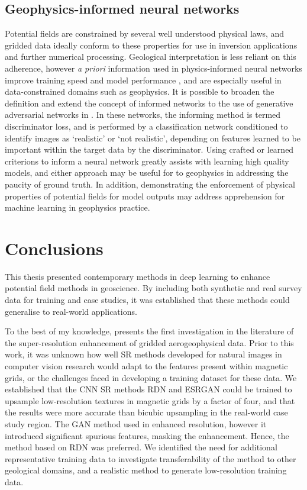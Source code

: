 \section{Geophysics-informed neural networks}
Potential fields are constrained by several well understood physical laws, and gridded data ideally conform to these properties for use in inversion applications and further numerical processing.
Geological interpretation is less reliant on this adherence, however \emph{a priori} information used in physics-informed neural networks improve training speed and model performance \parencite{raissiPhysicsinformedNeuralNetworks2019}, and are especially useful in data-constrained domains such as geophysics.
It is possible to broaden the definition and extend the concept of informed networks to the use of generative adversarial networks in .
In these networks, the informing method is termed discriminator loss, and is performed by a classification network conditioned to identify images as `realistic' or `not realistic', depending on features learned to be important within the target data by the discriminator.
Using crafted or learned criterions to inform a neural network greatly assists with learning high quality models, and either approach may be useful for to geophysics in addressing the paucity of ground truth.
In addition, demonstrating the enforcement of physical properties of potential fields for model outputs may address apprehension for machine learning in geophysics practice.

\printbibliography{}

\chapter{Conclusions}
\label{ch:conclusions}
This thesis presented contemporary methods in deep learning to enhance potential field methods in geoscience.
By including both synthetic and real survey data for training and case studies, it was established that these methods could generalise to real-world applications.

To the best of my knowledge,  presents the first investigation in the literature of the super-resolution enhancement of gridded aerogeophysical data.
Prior to this work, it was unknown how well SR methods developed for natural images in computer vision research would adapt to the features present within magnetic grids, or the challenges faced in developing a training dataset for these data.
We established that the CNN SR methods RDN and ESRGAN could be trained to upsample low-resolution textures in magnetic grids by a factor of four, and that the results were more accurate than bicubic upsampling in the real-world case study region.
The GAN method used in  enhanced resolution, however it introduced significant spurious features, masking the enhancement.
Hence, the method based on RDN was preferred.
We identified the need for additional representative training data to investigate transferability of the method to other geological domains, and a realistic method to generate low-resolution training data.

